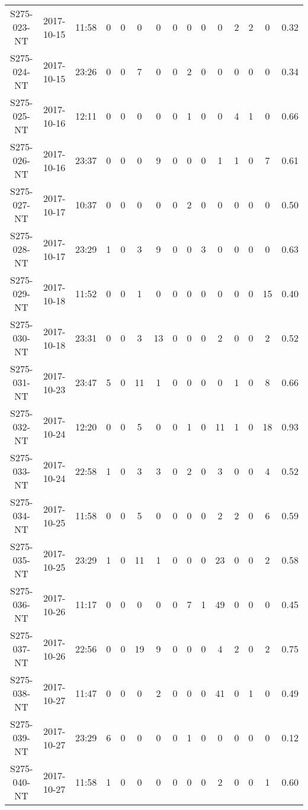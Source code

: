\begin{longtable}{ccccccccccccccc}
  S275-023-NT & 2017-10-15 & 11:58 & 0 & 0 & 0 & 0 & 0 & 0 & 0 & 0 & 2 & 2 & 0 & 0.32 \\ 
  S275-024-NT & 2017-10-15 & 23:26 & 0 & 0 & 7 & 0 & 0 & 2 & 0 & 0 & 0 & 0 & 0 & 0.34 \\ 
  S275-025-NT & 2017-10-16 & 12:11 & 0 & 0 & 0 & 0 & 0 & 1 & 0 & 0 & 4 & 1 & 0 & 0.66 \\ 
  S275-026-NT & 2017-10-16 & 23:37 & 0 & 0 & 0 & 9 & 0 & 0 & 0 & 1 & 1 & 0 & 7 & 0.61 \\ 
  S275-027-NT & 2017-10-17 & 10:37 & 0 & 0 & 0 & 0 & 0 & 2 & 0 & 0 & 0 & 0 & 0 & 0.50 \\ 
  S275-028-NT & 2017-10-17 & 23:29 & 1 & 0 & 3 & 9 & 0 & 0 & 3 & 0 & 0 & 0 & 0 & 0.63 \\ 
  S275-029-NT & 2017-10-18 & 11:52 & 0 & 0 & 1 & 0 & 0 & 0 & 0 & 0 & 0 & 0 & 15 & 0.40 \\ 
  S275-030-NT & 2017-10-18 & 23:31 & 0 & 0 & 3 & 13 & 0 & 0 & 0 & 2 & 0 & 0 & 2 & 0.52 \\ 
  S275-031-NT & 2017-10-23 & 23:47 & 5 & 0 & 11 & 1 & 0 & 0 & 0 & 0 & 1 & 0 & 8 & 0.66 \\ 
  S275-032-NT & 2017-10-24 & 12:20 & 0 & 0 & 5 & 0 & 0 & 1 & 0 & 11 & 1 & 0 & 18 & 0.93 \\ 
  S275-033-NT & 2017-10-24 & 22:58 & 1 & 0 & 3 & 3 & 0 & 2 & 0 & 3 & 0 & 0 & 4 & 0.52 \\ 
  S275-034-NT & 2017-10-25 & 11:58 & 0 & 0 & 5 & 0 & 0 & 0 & 0 & 2 & 2 & 0 & 6 & 0.59 \\ 
  S275-035-NT & 2017-10-25 & 23:29 & 1 & 0 & 11 & 1 & 0 & 0 & 0 & 23 & 0 & 0 & 2 & 0.58 \\ 
  S275-036-NT & 2017-10-26 & 11:17 & 0 & 0 & 0 & 0 & 0 & 7 & 1 & 49 & 0 & 0 & 0 & 0.45 \\ 
  S275-037-NT & 2017-10-26 & 22:56 & 0 & 0 & 19 & 9 & 0 & 0 & 0 & 4 & 2 & 0 & 2 & 0.75 \\ 
  S275-038-NT & 2017-10-27 & 11:47 & 0 & 0 & 0 & 2 & 0 & 0 & 0 & 41 & 0 & 1 & 0 & 0.49 \\ 
  S275-039-NT & 2017-10-27 & 23:29 & 6 & 0 & 0 & 0 & 0 & 1 & 0 & 0 & 0 & 0 & 0 & 0.12 \\ 
  S275-040-NT & 2017-10-27 & 11:58 & 1 & 0 & 0 & 0 & 0 & 0 & 0 & 2 & 0 & 0 & 1 & 0.60 \\ 
  \hline
\end{longtable}

